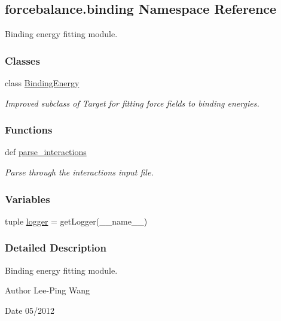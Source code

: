 \hypertarget{namespaceforcebalance_1_1binding}{\subsection{forcebalance.\-binding Namespace Reference}
\label{namespaceforcebalance_1_1binding}
}


Binding energy fitting module.  


\subsubsection*{Classes}
\begin{DoxyCompactItemize}
\item 
class \hyperlink{classforcebalance_1_1binding_1_1BindingEnergy}{Binding\-Energy}
\begin{DoxyCompactList}\small\item\em Improved subclass of Target for fitting force fields to binding energies. \end{DoxyCompactList}\end{DoxyCompactItemize}
\subsubsection*{Functions}
\begin{DoxyCompactItemize}
\item 
def \hyperlink{namespaceforcebalance_1_1binding_a0ae2f9f7a4ab7f4c64f8826de52331e9}{parse\-\_\-interactions}
\begin{DoxyCompactList}\small\item\em Parse through the interactions input file. \end{DoxyCompactList}\end{DoxyCompactItemize}
\subsubsection*{Variables}
\begin{DoxyCompactItemize}
\item 
tuple \hyperlink{namespaceforcebalance_1_1binding_a0bdb0d0390122623a60dae0e08bdc84a}{logger} = get\-Logger(\-\_\-\-\_\-name\-\_\-\-\_\-)
\end{DoxyCompactItemize}


\subsubsection{Detailed Description}
Binding energy fitting module. \begin{DoxyAuthor}{Author}
Lee-\/\-Ping Wang 
\end{DoxyAuthor}
\begin{DoxyDate}{Date}
05/2012 
\end{DoxyDate}


